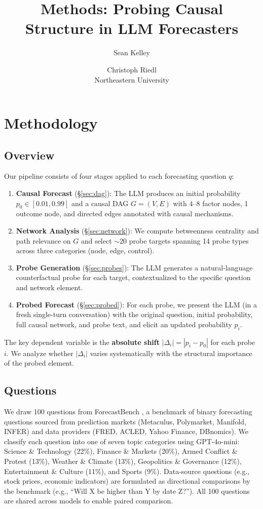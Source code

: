 \documentclass[11pt]{article}
\title{Methods: Probing Causal Structure in LLM Forecasters}
\author{
  Sean Kelley \and Christoph Riedl \\
  Northeastern University
}
\begin{document}
\maketitle

\section{Methodology}
\label{sec:method}

\subsection{Overview}

Our pipeline consists of four stages applied to each forecasting question $q$:

\begin{enumerate}
    \item \textbf{Causal Forecast} (\S\ref{sec:dag}): The LLM produces an initial probability $p_0 \in [0.01, 0.99]$ and a causal DAG $G = (V, E)$ with 4--8 factor nodes, 1 outcome node, and directed edges annotated with causal mechanisms.
    \item \textbf{Network Analysis} (\S\ref{sec:network}): We compute betweenness centrality and path relevance on $G$ and select ${\sim}$20 probe targets spanning 14 probe types across three categories (node, edge, control).
    \item \textbf{Probe Generation} (\S\ref{sec:probes}): The LLM generates a natural-language counterfactual probe for each target, contextualized to the specific question and network element.
    \item \textbf{Probed Forecast} (\S\ref{sec:probed}): For each probe, we present the LLM (in a fresh single-turn conversation) with the original question, initial probability, full causal network, and probe text, and elicit an updated probability $p_i$.
\end{enumerate}

The key dependent variable is the \textbf{absolute shift} $|\Delta_i| = |p_i - p_0|$ for each probe $i$. We analyze whether $|\Delta_i|$ varies systematically with the structural importance of the probed element.

\subsection{Questions}

We draw 100 questions from ForecastBench \cite{zou2024forecastbench}, a benchmark of binary forecasting questions sourced from prediction markets (Metaculus, Polymarket, Manifold, INFER) and data providers (FRED, ACLED, Yahoo Finance, DBnomics). We classify each question into one of seven topic categories using GPT-4o-mini: Science \& Technology (22\%), Finance \& Markets (20\%), Armed Conflict \& Protest (13\%), Weather \& Climate (13\%), Geopolitics \& Governance (12\%), Entertainment \& Culture (11\%), and Sports (9\%). Data-source questions (e.g., stock prices, economic indicators) are formulated as directional comparisons by the benchmark (e.g., ``Will X be higher than Y by date Z?''). All 100 questions are shared across models to enable paired comparison.
\end{document}
